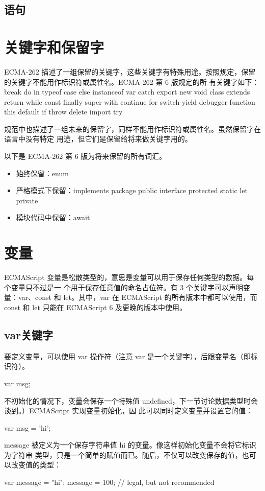 \subsection{语句}
\section{关键字和保留字\label{keywords}}
ECMA-262 描述了一组保留的关键字，这些关键字有特殊用途。按照规定，保留的关键字不能用作标识符或属性名。ECMA-262 第 6 版规定的所
有关键字如下：break do in typeof
case else instanceof var
catch export new void
class extends return while
const finally super with
continue for switch yield
debugger function this
default if throw
delete import try

规范中也描述了一组未来的保留字，同样不能用作标识符或属性名。虽然保留字在语言中没有特定
用途，但它们是保留给将来做关键字用的。

以下是 ECMA-262 第 6 版为将来保留的所有词汇。
\begin{itemize}
    \item 始终保留：enum
    \item 严格模式下保留：implements package public
          interface protected static
          let private
    \item 模块代码中保留：await
\end{itemize}
\section{变量}
ECMAScript 变量是松散类型的，意思是变量可以用于保存任何类型的数据。每个变量只不过是一
个用于保存任意值的命名占位符。有 3 个关键字可以声明变量：var、const 和 let。其中，var 在
ECMAScript 的所有版本中都可以使用，而 const 和 let 只能在 ECMAScript 6 及更晚的版本中使用。
\subsection{var关键字}
要定义变量，可以使用 var 操作符（注意 var 是一个关键字），后跟变量名（即标识符）。
\begin{js}
    var msg;
\end{js}
不初始化的情况下，变量会保存一个特殊值 undefined，下一节讨论数据类型时会谈到。）ECMAScript 实现变量初始化，因
此可以同时定义变量并设置它的值：
\begin{js}
    var msg = 'hi';
\end{js}

message 被定义为一个保存字符串值 hi 的变量。像这样初始化变量不会将它标识为字符串
类型，只是一个简单的赋值而已。随后，不仅可以改变保存的值，也可以改变值的类型：
\begin{js}
    var message = "hi";
    message = 100; // legal, but not recommended
\end{js}
